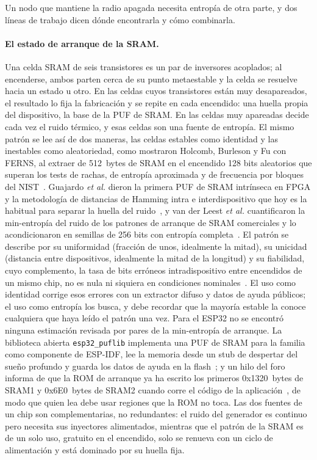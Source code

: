 Un nodo que mantiene la radio apagada necesita entropía de otra parte, y
dos líneas de trabajo dicen dónde encontrarla y cómo combinarla.

\paragraph{El estado de arranque de la SRAM.} Una celda SRAM de seis
transistores es un par de inversores acoplados; al encenderse, ambos
parten cerca de su punto metaestable y la celda se resuelve hacia un
estado u otro. En las celdas cuyos transistores están muy desapareados,
el resultado lo fija la fabricación y se repite en cada encendido: una
huella propia del dispositivo, la base de la PUF de SRAM. En las celdas
muy apareadas decide cada vez el ruido térmico, y esas celdas son una
fuente de entropía. El mismo patrón se lee así de dos maneras, las celdas
estables como identidad y las inestables como aleatoriedad, como
mostraron Holcomb, Burleson y Fu con FERNS, al extraer de 512~bytes de
SRAM en el encendido 128 bits aleatorios que superan los tests de rachas,
de entropía aproximada y de frecuencia por bloques del
NIST~\cite{holcomb_2009_powerup}. Guajardo \emph{et al.} dieron la primera
PUF de SRAM intrínseca en FPGA y la metodología de distancias de Hamming
intra e interdispositivo que hoy es la habitual para separar la huella
del ruido~\cite{guajardo_2007_fpga}, y van der Leest \emph{et al.}
cuantificaron la min-entropía del ruido de los patrones de arranque de
SRAM comerciales y lo acondicionaron en semillas de 256 bits con
entropía completa~\cite{vanderleest_2012_efficient}. El patrón se
describe por su uniformidad (fracción de unos, idealmente la mitad), su
unicidad (distancia entre dispositivos, idealmente la mitad de la
longitud) y su fiabilidad, cuyo complemento, la tasa de bits erróneos
intradispositivo entre encendidos de un mismo chip, no es nula ni
siquiera en condiciones
nominales~\cite{holcomb_2009_powerup, vanderleest_2012_efficient}. El uso
como identidad corrige esos errores con un extractor difuso y datos de
ayuda públicos; el uso como entropía los busca, y debe recordar que la
mayoría estable la conoce cualquiera que haya leído el patrón una vez.
Para el ESP32 no se encontró ninguna estimación revisada por pares de la
min-entropía de arranque. La biblioteca abierta \texttt{esp32\_\allowbreak{}puflib}
implementa una PUF de SRAM para la familia como componente de ESP-IDF,
lee la memoria desde un stub de despertar del sueño profundo y guarda los
datos de ayuda en la flash~\cite{stanicek_esp32_puflib}; y un hilo del
foro informa de que la ROM de arranque ya ha escrito los primeros
0x1320~bytes de SRAM1 y 0x6E0~bytes de SRAM2 cuando corre el código de la
aplicación~\cite{esp32forum_wakestub}, de modo que quien lea debe usar
regiones que la ROM no toca. Las dos fuentes de un chip son
complementarias, no redundantes: el ruido del generador es continuo pero
necesita sus inyectores alimentados, mientras que el patrón de la SRAM es
de un solo uso, gratuito en el encendido, solo se renueva con un ciclo de
alimentación y está dominado por su huella fija.

